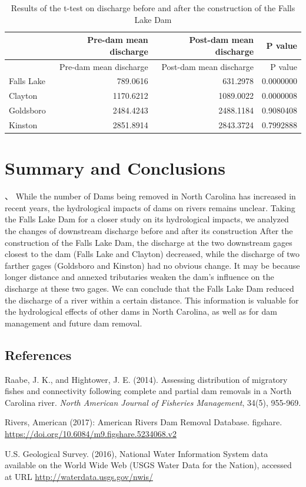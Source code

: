 \documentclass[
  12pt,
]{article}
\begin{document}
\begin{longtable}[]{@{}lrrr@{}}
\caption{Results of the t-test on discharge before and after the
construction of the Falls Lake Dam}\tabularnewline
\toprule
& Pre-dam mean discharge & Post-dam mean discharge & P
value\tabularnewline
\midrule
\endfirsthead
\toprule
& Pre-dam mean discharge & Post-dam mean discharge & P
value\tabularnewline
\midrule
\endhead
Falls Lake & 789.0616 & 631.2978 & 0.0000000\tabularnewline
Clayton & 1170.6212 & 1089.0022 & 0.0000008\tabularnewline
Goldsboro & 2484.4243 & 2488.1184 & 0.9080408\tabularnewline
Kinston & 2851.8914 & 2843.3724 & 0.7992888\tabularnewline
\bottomrule
\end{longtable}

\newpage

\hypertarget{summary-and-conclusions}{%
\section{Summary and Conclusions}\label{summary-and-conclusions}}

、 While the number of Dams being removed in North Carolina has
increased in recent years, the hydrological impacts of dams on rivers
remains unclear. Taking the Falls Lake Dam for a closer study on its
hydrological impacts, we analyzed the changes of downstream discharge
before and after its construction After the construction of the Falls
Lake Dam, the discharge at the two downstream gages closest to the dam
(Falls Lake and Clayton) decreased, while the discharge of two farther
gages (Goldsboro and Kinston) had no obvious change. It may be because
longer distance and annexed tributaries weaken the dam's influence on
the discharge at these two gages. We can conclude that the Falls Lake
Dam reduced the discharge of a river within a certain distance. This
information is valuable for the hydrological effects of other dams in
North Carolina, as well as for dam management and future dam removal.

\newpage

\hypertarget{references}{%
\subsection{References}\label{references}}

Raabe, J. K., and Hightower, J. E. (2014). Assessing distribution of
migratory fishes and connectivity following complete and partial dam
removals in a North Carolina river. \emph{North American Journal of
Fisheries Management}, 34(5), 955-969.

Rivers, American (2017): American Rivers Dam Removal Database. figshare.
\url{https://doi.org/10.6084/m9.figshare.5234068.v2}

U.S. Geological Survey. (2016), National Water Information System data
available on the World Wide Web (USGS Water Data for the Nation),
accessed at URL \url{http://waterdata.usgs.gov/nwis/}
\end{document}
